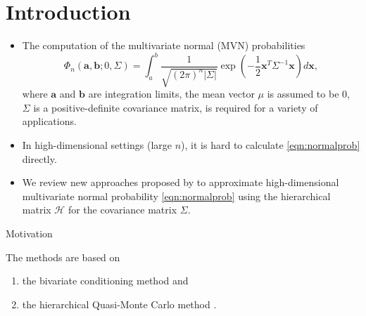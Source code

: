 \section{Introduction}

\begin{frame}{\secname}

    \begin{itemize}
        \item The computation of the multivariate normal (MVN) probabilities 
        \begin{equation}\label{eqn:normalprob}
            \Phi_n(\mathbf{a}, \mathbf{b}; 0, \Sigma) = \int_a^b \frac{1}{\sqrt{(2\pi)^n |\Sigma|}} \exp\left( -\frac{1}{2} \mathbf{x}^T \Sigma^{-1} \mathbf{x} \right) d\mathbf{x},
        \end{equation}
        where $\mathbf{a}$ and $\mathbf{b}$ are integration limits, the mean vector $\mu$ is assumed to be 0, $\Sigma$ is a positive-definite covariance matrix, is required for a variety of applications. 
        \item In high-dimensional settings (large $n$), it is hard to calculate \eqref{eqn:normalprob} directly.
        \item We review new approaches proposed by \citet{cao2019hierarchical} to approximate high-dimensional multivariate normal probability \eqref{eqn:normalprob}
        using the hierarchical matrix $\mathcal{H}$ \citep{hackbusch2015hierarchical} for the covariance matrix $\Sigma$. 
    \end{itemize}
    
\end{frame}

\begin{frame}{Motivation}
    
    The methods are based on 
        \begin{enumerate}
            \item the bivariate conditioning method \citep{trinh2015bivariate} and
            \item the hierarchical Quasi-Monte Carlo method \citep{genton2018hierarchical}.
        \end{enumerate} 
\end{frame}